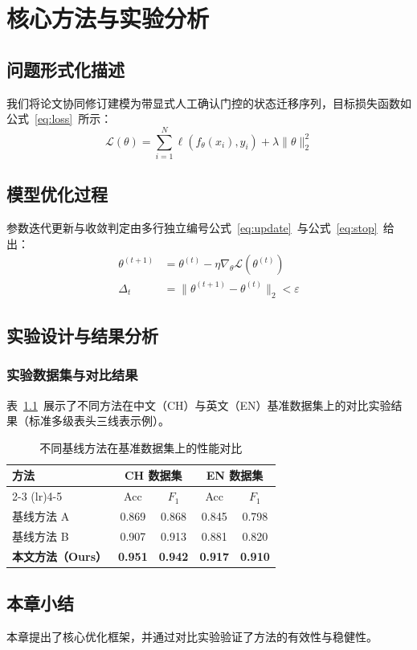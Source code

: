 \chapter{核心方法与实验分析}
\label{chap:method}

\section{问题形式化描述}
我们将论文协同修订建模为带显式人工确认门控的状态迁移序列，目标损失函数如公式~\eqref{eq:loss}~所示：
\begin{equation}
  \mathcal{L}(\theta) = \sum_{i=1}^{N} \ell(f_\theta(x_i), y_i) + \lambda \|\theta\|_2^2
  \label{eq:loss}
\end{equation}

\section{模型优化过程}
参数迭代更新与收敛判定由多行独立编号公式~\eqref{eq:update}~与公式~\eqref{eq:stop}~给出：
\begin{align}
  \theta^{(t+1)} &= \theta^{(t)} - \eta \nabla_\theta \mathcal{L}(\theta^{(t)}) \label{eq:update} \\
  \Delta_t &= \|\theta^{(t+1)} - \theta^{(t)}\|_2 < \varepsilon \label{eq:stop}
\end{align}

\section{实验设计与结果分析}
\subsection{实验数据集与对比结果}
表~\ref{tab:exp}~展示了不同方法在中文（CH）与英文（EN）基准数据集上的对比实验结果（标准多级表头三线表示例）。

\begin{table}[htbp]
  \centering
  \caption{不同基线方法在基准数据集上的性能对比}
  \label{tab:exp}
  \begin{tabular}{lcccc}
    \toprule
    \multirow{2}{*}{\textbf{方法}} & \multicolumn{2}{c}{\textbf{CH 数据集}} & \multicolumn{2}{c}{\textbf{EN 数据集}} \\
    \cmidrule(lr){2-3} \cmidrule(lr){4-5}
    & Acc & $F_1$ & Acc & $F_1$ \\
    \midrule
    基线方法 A\cite{he2016deep} & 0.869 & 0.868 & 0.845 & 0.798 \\
    基线方法 B\cite{devlin2019bert} & 0.907 & 0.913 & 0.881 & 0.820 \\
    \textbf{本文方法（Ours）} & \textbf{0.951} & \textbf{0.942} & \textbf{0.917} & \textbf{0.910} \\
    \bottomrule
  \end{tabular}
\end{table}

\section{本章小结}
本章提出了核心优化框架，并通过对比实验验证了方法的有效性与稳健性。
